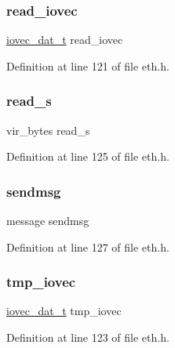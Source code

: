 \subsubsection{\texorpdfstring{read\+\_\+iovec}{read\_iovec}}
{\footnotesize\ttfamily \hyperlink{eth_8h_abdec48788bda4ee60b73595dc65e65d5}{iovec\+\_\+dat\+\_\+t} read\+\_\+iovec}



Definition at line 121 of file eth.\+h.

\hypertarget{structeth__card_aad26cb8272451cf5ef65501662f51e91}{}\label{structeth__card_aad26cb8272451cf5ef65501662f51e91} 
\subsubsection{\texorpdfstring{read\+\_\+s}{read\_s}}
{\footnotesize\ttfamily vir\+\_\+bytes read\+\_\+s}



Definition at line 125 of file eth.\+h.

\hypertarget{structeth__card_aa5eddbd0b3cb93e6d3b798241bbafb35}{}\label{structeth__card_aa5eddbd0b3cb93e6d3b798241bbafb35} 
\subsubsection{\texorpdfstring{sendmsg}{sendmsg}}
{\footnotesize\ttfamily message sendmsg}



Definition at line 127 of file eth.\+h.

\hypertarget{structeth__card_ac9db8f91c9cd186a23a4de567da2e87e}{}\label{structeth__card_ac9db8f91c9cd186a23a4de567da2e87e} 
\subsubsection{\texorpdfstring{tmp\+\_\+iovec}{tmp\_iovec}}
{\footnotesize\ttfamily \hyperlink{eth_8h_abdec48788bda4ee60b73595dc65e65d5}{iovec\+\_\+dat\+\_\+t} tmp\+\_\+iovec}



Definition at line 123 of file eth.\+h.

